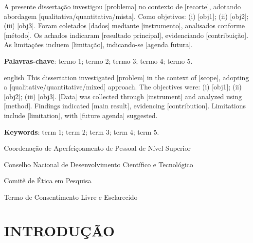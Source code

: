\documentclass[
    12pt,
    openright,
    twoside,
    a4paper,
    chapter=TITLE,
    sumario=tradicional,
    section=TITLE,
    english,
    brazil
]{abntex2}
\begin{document}
\setlength{\absparsep}{18pt}
\begin{resumo}
\noindent A presente dissertação investigou [problema] no contexto
de [recorte], adotando abordagem [qualitativa/quantitativa/mista].
Como objetivos: (i) [obj1]; (ii) [obj2]; (iii) [obj3]. Foram
coletados [dados] mediante [instrumento], analisados conforme
[método]. Os achados indicaram [resultado principal], evidenciando
[contribuição]. As limitações incluem [limitação], indicando-se
[agenda futura].

\noindent\textbf{Palavras-chave}: termo 1; termo 2; termo 3;
termo 4; termo 5.
\end{resumo}

\begin{resumo}[Abstract]
\begin{otherlanguage*}{english}
\noindent This dissertation investigated [problem] in the context
of [scope], adopting a [qualitative/quantitative/mixed] approach.
The objectives were: (i) [obj1]; (ii) [obj2]; (iii) [obj3]. [Data]
was collected through [instrument] and analyzed using [method].
Findings indicated [main result], evidencing [contribution].
Limitations include [limitation], with [future agenda] suggested.

\noindent\textbf{Keywords}: term 1; term 2; term 3; term 4; term 5.
\end{otherlanguage*}
\end{resumo}

\listoffigures*
\cleardoublepage

\listoftables*
\cleardoublepage

\begin{siglas}
\item[CAPES] Coordenação de Aperfeiçoamento de Pessoal de Nível Superior
\item[CNPq] Conselho Nacional de Desenvolvimento Científico e Tecnológico
\item[CEP] Comitê de Ética em Pesquisa
\item[TCLE] Termo de Consentimento Livre e Esclarecido
\end{siglas}

\tableofcontents*
\cleardoublepage

\textual

\chapter{INTRODUÇÃO}
\end{document}
